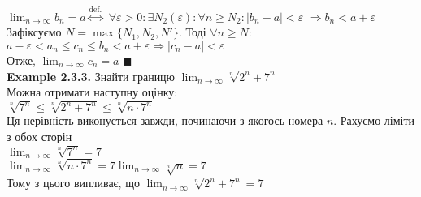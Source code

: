 \documentclass[a4paper, 14pt]{extarticle}
\def\bigline{\vspace{5mm}\\}
\def\bigline{\vspace{5mm}\\}
\def\qed{$\blacksquare$}
\def\limitdef#1#2#3#4#5{$\displaystyle \forall #1 > 0: \exists #2(#1): \forall #3 \geq #2: \left|#4 - #5\right| < #1$}
\begin{document}
	$\displaystyle \lim_{n \to \infty} b_n = a \overset{\textrm{def.}}{\iff}$ \limitdef{\varepsilon}{N_2}{n}{b_n}{a} $\Rightarrow b_n<a+\varepsilon$\\
	Зафіксуємо $N=\max\{N_1, N_2, N'\}$. Тоді $\forall n \geq N:$\\
	$a-\varepsilon< a_n \leq c_n \leq b_n < a+\varepsilon \Rightarrow |c_n - a|<\varepsilon$\\
	Отже, $\displaystyle \lim_{n \to \infty} c_n = a$ \qed
	\bigline
	\textbf{Example 2.3.3.} Знайти границю $\displaystyle \lim_{n \to \infty} \sqrt[n]{2^n+7^n}$\\
	Можна отримати наступну оцінку:\\
	$\sqrt[n]{7^n} \leq \sqrt[n]{2^n+7^n} \leq \sqrt[n]{n\cdot 7^n}$\\
	Ця нерівність виконується завжди, починаючи з якогось номера $n$. Рахуємо ліміти з обох сторін\\
	$\displaystyle \lim_{n \to \infty} \sqrt[n]{7^n} = 7$\\
	$\displaystyle \lim_{n \to \infty} \sqrt[n]{n \cdot 7^n} = 7 \lim_{n \to \infty} \sqrt[n]{n} = 7$\\
	Тому з цього випливає, що $\displaystyle \lim_{n \to \infty} \sqrt[n]{2^n+7^n} = 7$\\
	
\end{document}
